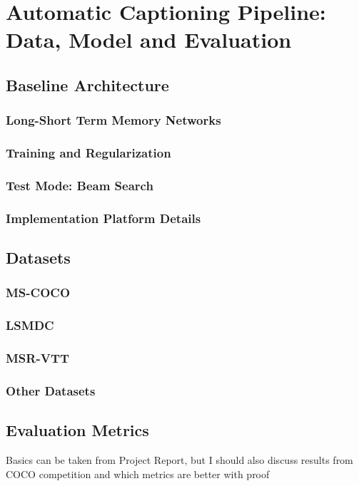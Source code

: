 \chapter{Automatic Captioning Pipeline: Data, Model and Evaluation}
\label{chapter:baseline}
\section{Baseline Architecture}
\subsection{Long-Short Term Memory Networks}
\subsection{Training and Regularization}
\subsection{Test Mode: Beam Search}
\subsection{Implementation Platform Details}
\section{Datasets}
\subsection{MS-COCO}
\subsection{LSMDC}
\subsection{MSR-VTT}
\subsection{Other Datasets}
\section{Evaluation Metrics}
Basics can be taken from Project Report, but I should also
discuss results from COCO competition and which metrics are better with proof
